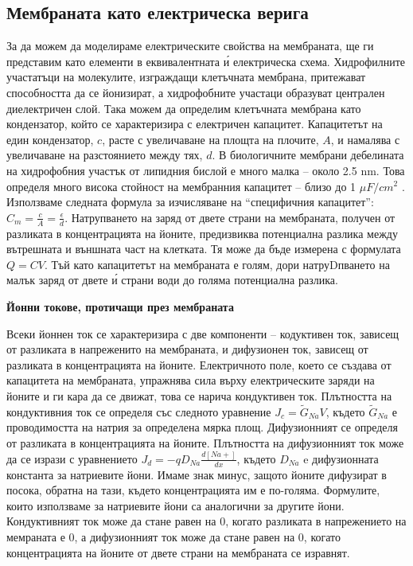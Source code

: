 \documentclass{article}
\numberwithin{equation}{section}
\begin{document}
\vspace{5mm} %
\subsection{Мембраната като електрическа верига}

За да можем да моделираме електрическите свойства на мембраната, ще ги представим като елементи в еквивалентната \'{и} електрическа схема.
Хидрофилните участатъци на молекулите, изграждащи клетъчната мембрана, притежават способността да се йонизират, а хидрофобните участаци
образуват централен диелектричен слой. Така можем да определим клетъчната мембрана като кондензатор, който се характеризира с електричен
капацитет. Капацитетът на един кондензатор, $c$, расте с увеличаване на площта на плочите, $A$, и намалява с увеличаване на разстоянието
между тях, $d$. В биологичните мембрани дебелината на хидрофобния участък от липидния бислой е много малка – около 2.5 nm. Това определя
много висока стойност на мембранния капацитет – близо до 1 $\mu F/cm^2$ .  Използваме следната формула за изчисляване на “специфичния
капацитет”: $C_{m}=\frac{c}{A}=\frac{\epsilon}{d}$. Натрупването на заряд от двете страни на мембраната, получен от разликата в
концентрацията на йоните, предизвиква потенциална разлика между вътрешната и външната част на клетката. Тя може да бъде измерена с формулата
$Q=CV$. Тъй като капацитетът на мембраната е голям, дори натруDпването на малък заряд от двете \'{и} страни води до голяма потенциална
разлика. 

\vspace{5mm} %
\textbf{Йонни токове, протичащи през мембраната}

Всеки йоннен ток се характеризира с две компоненти -- кодуктивен ток, зависещ от разликата в напреженито на мембраната, и дифузионен ток,
зависещ от разликата в концентрацията на йоните. Електричното поле, което се създава от капацитета на мембраната, упражнява сила върху
електрическите заряди на йоните и ги кара да се движат, това се нарича кондуктивен ток. Плътността на кондуктивния ток се определя със
следното уравнение $J_c=\tilde{G}_{Na}V$, където $\tilde{G}_{Na}$ е проводимостта на натрия за определена мярка площ. Дифузионният се
определя от разликата в концентрацията на йоните. Плътността на дифузионният ток може да се изрази с уравнението
$J_d=-qD_{Na}\frac{d[Na+]}{dx}$, където $D_{Na}$ e дифузионната константа за натриевите йони. Имаме знак минус, защото йоните дифузират в
посока, обратна на тази, където концентрацията им е по-голяма. Формулите, които използваме за натриевите йони са аналогични за другите йони.
Кондуктивният ток може да стане равен на 0, когато разликата в напрежението на мемраната е 0, а дифузионният ток може да стане равен на 0,
когато концентрацията на йоните от двете страни на мембраната се изравнят. 
\end{document}

